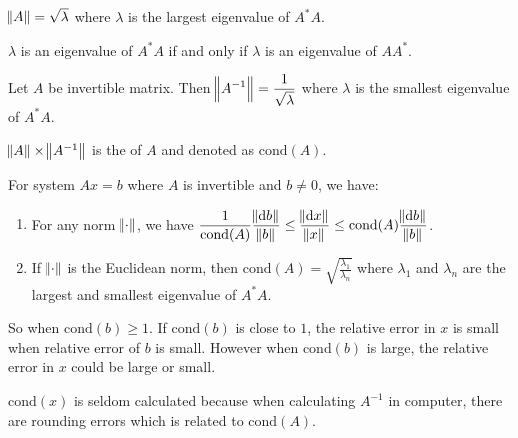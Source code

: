 \begin{theorem}
    $\norm{A} = \sqrt{\lambda}$ where $\lambda$ is the largest eigenvalue of $A^* A$.
\end{theorem}

\begin{theorem}
    $\lambda$ is an eigenvalue of $A^* A$ if and only if $\lambda$ is an eigenvalue of $AA^*$.
\end{theorem}

\begin{theorem}
    Let $A$ be invertible matrix. Then $\displaystyle \norm{A^{-1}} = \frac{1}{\sqrt{\lambda}}$ where $\lambda$ is the smallest eigenvalue of $A^*A$.
\end{theorem}

\begin{definition}
    $\norm{A} \times \norm{A^{-1}}$ is the  of $A$ and denoted as $\text{cond}(A)$.
\end{definition}

\begin{theorem}
    For system $Ax=b$ where $A$ is invertible and $b \neq 0$, we have:
    \begin{enumerate}
        \item For any norm $\norm{\cdot}$, we have $\displaystyle \frac{1}{\text{cond}(A)} \frac{\norm{\dif b}}{\norm{b}} \leq \frac{\norm{\dif x}}{\norm{x}} \leq \text{cond}(A) \frac{\norm{\dif b}}{\norm{b}}$.
        \item If $\norm{\cdot}$ is the Euclidean norm, then $\displaystyle \text{cond}(A) = \sqrt{\frac{\lambda_1}{\lambda_n}}$ where $\lambda_1$ and $\lambda_n$ are the largest and smallest eigenvalue of $A^*A$.
    \end{enumerate}
    
    So when $\text{cond} (b) \geq 1$. If $\text{cond}(b)$ is close to $1$, the relative error in $x$ is small when relative error of $b$ is small. However when $\text{cond}(b)$ is large, the relative error in $x$ could be large or small. 
    
    $\text{cond}(x)$ is seldom calculated because when calculating $A^{-1}$ in computer, there are rounding errors which is related to $\text{cond}(A)$.
\end{theorem}


